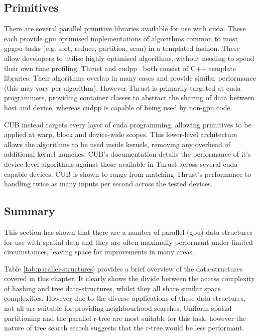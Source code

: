   \subsection{Primitives}
    There are several parallel primitive libraries available for use with \gls{cuda}. These each provide \gls{gpu} optimised implementations of algorithms common to most \gls{gpgpu} tasks (e.g. sort, reduce, partition, scan) in a templated fashion. These allow developers to utilise highly optimised algorithms, without needing to spend their own time profiling.
    Thrust \cite{Thrust} and \gls{cudpp}\ \cite{CUDPP} both consist of C++ template libraries. Their algorithms overlap in many cases and provide similar performance (this may vary per algorithm). However Thrust is primarily targeted at \gls{cuda} programmers, providing container classes to abstract the sharing of data between host and device, whereas \gls{cudpp} is capable of being used by non-\gls{gpu} code.
    
    CUB \cite{CUB} instead targets every layer of \gls{cuda} programming, allowing primitives to be applied at warp, block and device-wide scopes. This lower-level architecture allows the algorithms to be used inside kernels, removing any overhead of additional kernel launches. CUB's documentation details the performance of it's device level algorithms against those available in Thrust across several \gls{cuda}-capable devices. CUB is shown to range from matching Thrust's performance to handling twice as many inputs per second across the tested devices.    
    
  \subsection{Summary}
    This section has shown that there are a number of parallel (\gls{gpu}) data-structures for use with spatial data and they are often maximally performant under limited circumstances, leaving space for improvements in many areas. 
    
    Table \ref{tab:parallel-structures} provides a brief overview of the data-structures covered in this chapter. It clearly shows the divide between the access complexity of hashing and tree data-structures, whilst they all share similar space complexities. However due to the diverse applications of these data-structures, not all are suitable for providing neighbourhood searches. Uniform spatial partitioning and the parallel r-tree are most suitable for this task, however the nature of tree search search suggests that the r-tree would be less performant.
    
